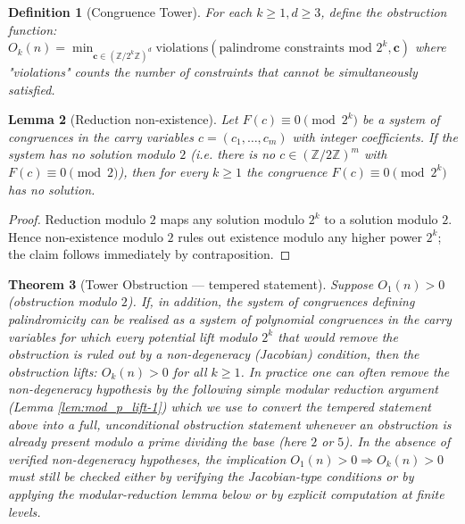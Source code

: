 \documentclass[12pt,a4paper]{article}
\newtheorem{theorem}{Theorem}[section]
\newtheorem{lemma}[theorem]{Lemma}
\newtheorem{definition}[theorem]{Definition}
\begin{document}
\begin{definition}[Congruence Tower]
For each $k \geq 1, d \geq 3$, define the obstruction function:
$O_k(n) = \min_{\mathbf{c} \in (\mathbb{Z}/2^k\mathbb{Z})^d} \text{violations}(\text{palindrome constraints mod } 2^k, \mathbf{c})$
where "violations" counts the number of constraints that cannot be simultaneously satisfied.
\end{definition}

\begin{lemma}[Reduction non-existence]
Let $F(c)\equiv 0\pmod{2^k}$ be a system of congruences in the carry variables $c=(c_1,\dots,c_m)$ with integer coefficients. If the system has no solution modulo $2$ (i.e. there is no $c\in(\mathbb Z/2\mathbb Z)^m$ with $F(c)\equiv0\pmod 2$), then for every $k\ge1$ the congruence $F(c)\equiv0\pmod{2^k}$ has no solution.
\end{lemma}

\begin{proof}
Reduction modulo $2$ maps any solution modulo $2^k$ to a solution modulo $2$. Hence non-existence modulo $2$ rules out existence modulo any higher power $2^k$; the claim follows immediately by contraposition.
\end{proof}

\begin{theorem}[Tower Obstruction --- tempered statement]%
Suppose $O_1(n) > 0$ (obstruction modulo $2$). If, in addition, the system of congruences defining palindromicity can be realised as a system of polynomial congruences in the carry variables for which every potential lift modulo $2^k$ that would remove the obstruction is ruled out by a non-degeneracy (Jacobian) condition, then the obstruction lifts: $O_k(n) > 0$ for all $k\ge 1$.
In practice one can often remove the non-degeneracy hypothesis by the following simple modular reduction argument (Lemma \ref{lem:mod_p_lift-1}) which we use to convert the tempered statement above into a full, unconditional obstruction statement whenever an obstruction is already present modulo a prime dividing the base (here $2$ or $5$).
In the absence of verified non-degeneracy hypotheses, the implication $O_1(n)>0 \Rightarrow O_k(n)>0$ must still be checked either by verifying the Jacobian-type conditions or by applying the modular-reduction lemma below or by explicit computation at finite levels.
\end{theorem}
\end{document}
